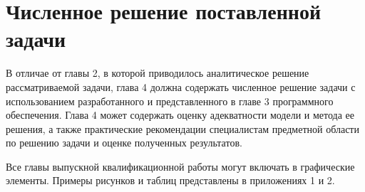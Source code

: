 \section{Численное решение поставленной задачи}

В отличае от главы 2, в которой приводилось аналитическое решение рассматриваемой задачи, глава 4 должна содержать численное решение задачи с использованием разработанного и представленного в главе 3 программного обеспечения. Глава 4 может содержать оценку адекватности модели и метода ее решения, а также практические рекомендации специалистам предметной области по решению задачи и оценке полученных результатов.

Все главы выпускной квалификационной работы могут включать в графические элементы. Примеры рисунков и таблиц представлены в приложениях 1 и 2. 





